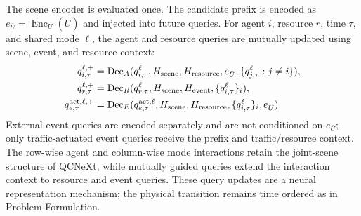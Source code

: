 \documentclass[letterpaper]{article} %
\begin{document}
The scene encoder is evaluated once. The candidate prefix is encoded as
$e_{\bar U}=\operatorname{Enc}_U(\bar U)$ and injected into future queries.
For agent $i$, resource $r$, time $\tau$, and shared mode $\ell$, the
agent and resource queries are mutually updated using scene, event, and
resource context:
\begin{align}
q_{i,\tau}^{\ell,+}&=\operatorname{Dec}_A(q_{i,\tau}^{\ell},
H_{\rm scene},H_{\rm resource},e_{\bar U},
\{q_{j,\tau}^{\ell}:j\ne i\}),\nonumber\\
q_{r,\tau}^{\ell,+}&=\operatorname{Dec}_R(q_{r,\tau}^{\ell},
H_{\rm scene},H_{\rm event},\{q_{i,\tau}^{\ell}\}_i),\nonumber\\
q_{e,\tau}^{\mathrm{act},\ell,+}&=\operatorname{Dec}_E(q_{e,\tau}^{\mathrm{act},\ell},
H_{\rm scene},H_{\rm resource},\{q_{i,\tau}^{\ell}\}_i,e_{\bar U}).
\label{eq:query-update}
\end{align}
External-event queries are encoded separately and are not conditioned on
$e_{\bar U}$; only traffic-actuated event queries receive the prefix and
traffic/resource context. The row-wise agent and column-wise mode
interactions retain the joint-scene structure of QCNeXt, while mutually
guided queries extend the interaction context to resource and event queries.
These query updates are a neural representation mechanism; the physical
transition remains time ordered as in Problem Formulation.
\end{document}

